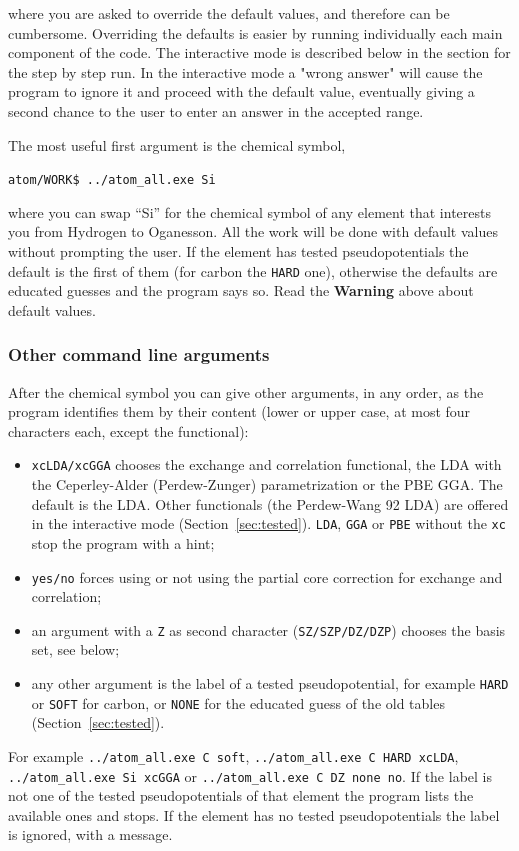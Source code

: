 \documentclass[11pt]{article}
\begin{document}
\noindent
where you are asked to override the default values, and therefore can be cumbersome.
Overriding the defaults is easier by running individually each main
component of the code.
The interactive mode is described below in the section for the step by step run.
In the interactive mode a "wrong answer" will cause the program to ignore it and proceed
with the default value, eventually giving a second chance to the user to enter an
answer in the accepted range.


The most useful first argument is the chemical symbol,

\noindent\texttt{atom/WORK\$ ../atom{\_}all.exe Si}

where you can swap ``Si'' for the chemical symbol of any element
that interests you from Hydrogen to Oganesson.
All the work will be done with default values without prompting the user.
If the element has tested pseudopotentials the default is the first of them
(for carbon the \texttt{HARD} one), otherwise the defaults are educated guesses
and the program says so.
Read the \textbf{Warning} above about default values.

\subsubsection{Other command line arguments}
\label{sec:run-args}

After the chemical symbol you can give other arguments, in any order,
as the program identifies them by their content (lower or upper case,
at most four characters each, except the functional):
\begin{itemize}
\item \texttt{xcLDA/xcGGA} chooses the exchange and correlation functional,
the LDA with the Ceperley-Alder (Perdew-Zunger) parametrization or the PBE GGA.
The default is the LDA.  Other functionals (the Perdew-Wang 92 LDA) are
offered in the interactive mode (Section~\ref{sec:tested}).
\texttt{LDA}, \texttt{GGA} or \texttt{PBE} without the \texttt{xc} stop the program with a hint;
\item \texttt{yes/no} forces using or not using the partial core correction
for exchange and correlation;
\item an argument with a \texttt{Z} as second character (\texttt{SZ/SZP/DZ/DZP})
chooses the basis set, see below;
\item any other argument is the label of a tested pseudopotential, for example
\texttt{HARD} or \texttt{SOFT} for carbon, or \texttt{NONE} for the educated guess
of the old tables (Section~\ref{sec:tested}).
\end{itemize}
For example \texttt{../atom\_all.exe C soft}, \texttt{../atom\_all.exe C HARD xcLDA},
\texttt{../atom\_all.exe Si xcGGA} or \texttt{../atom\_all.exe C DZ none no}.
If the label is not one of the tested pseudopotentials of that element the program
lists the available ones and stops.  If the element has no tested pseudopotentials
the label is ignored, with a message.
\end{document}
